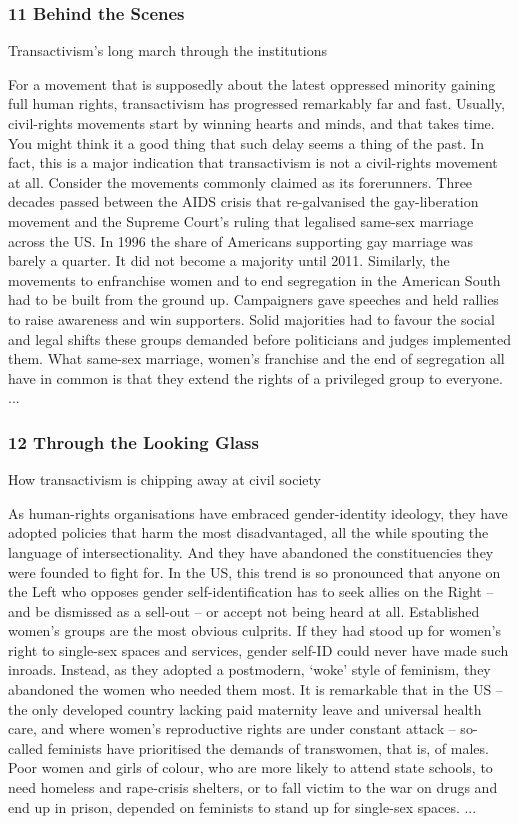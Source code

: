 \documentclass[10pt,titlepage]{book}
\begin{document}
\subsubsection{11 Behind the Scenes}

Transactivism’s long march through the institutions

For a movement that is supposedly about the latest oppressed minority gaining full human rights, transactivism has progressed remarkably far and fast. Usually, civil-rights movements start by winning hearts and minds, and that takes time. You might think it a good thing that such delay seems a thing of the past. In fact, this is a major indication that transactivism is not a civil-rights movement at all. Consider the movements commonly claimed as its forerunners. Three decades passed between the AIDS crisis that re-galvanised the gay-liberation movement and the Supreme Court’s ruling that legalised same-sex marriage across the US. In 1996 the share of Americans supporting gay marriage was barely a quarter. It did not become a majority until 2011. Similarly, the movements to enfranchise women and to end segregation in the American South had to be built from the ground up. Campaigners gave speeches and held rallies to raise awareness and win supporters. Solid majorities had to favour the social and legal shifts these groups demanded before politicians and judges implemented them. What same-sex marriage, women’s franchise and the end of segregation all have in common is that they extend the rights of a privileged group to everyone.
...

\subsubsection{12 Through the Looking Glass}

How transactivism is chipping away at civil society

As human-rights organisations have embraced gender-identity ideology, they have adopted policies that harm the most disadvantaged, all the while spouting the language of intersectionality. And they have abandoned the constituencies they were founded to fight for. In the US, this trend is so pronounced that anyone on the Left who opposes gender self-identification has to seek allies on the Right – and be dismissed as a sell-out – or accept not being heard at all. Established women’s groups are the most obvious culprits. If they had stood up for women’s right to single-sex spaces and services, gender self-ID could never have made such inroads. Instead, as they adopted a postmodern, ‘woke’ style of feminism, they abandoned the women who needed them most. It is remarkable that in the US – the only developed country lacking paid maternity leave and universal health care, and where women’s reproductive rights are under constant attack – so-called feminists have prioritised the demands of transwomen, that is, of males. Poor women and girls of colour, who are more likely to attend state schools, to need homeless and rape-crisis shelters, or to fall victim to the war on drugs and end up in prison, depended on feminists to stand up for single-sex spaces.
...
\end{document}
